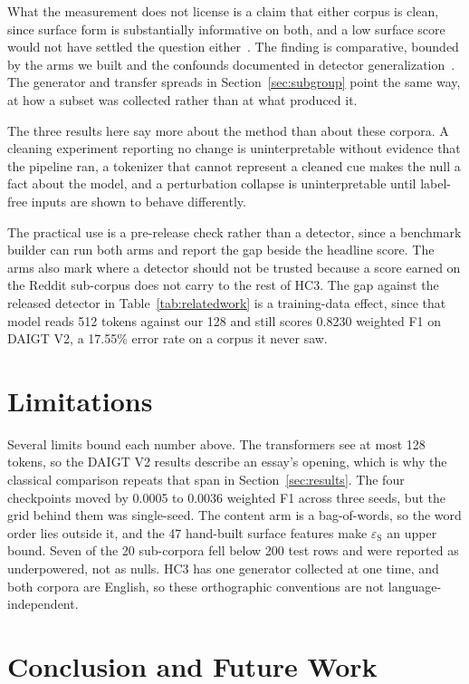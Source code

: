 \documentclass[conference,a4paper]{IEEEtran}
\newcommand{\secref}[1]{\hyperref[#1]{\ref*{#1}}}
\newcommand{\tabref}[1]{\hyperref[#1]{\ref*{#1}}}
\begin{document}
What the measurement does not license is a claim that either corpus is clean, since surface form is substantially informative on both, and a low surface score would not have settled the question either~\cite{Feng2019misleading}. The finding is comparative, bounded by the arms we built and the confounds documented in detector generalization~\cite{Borile2025generalize}. The generator and transfer spreads in Section~\secref{sec:subgroup} point the same way, at how a subset was collected rather than at what produced it.

The three results here say more about the method than about these corpora. A cleaning experiment reporting no change is uninterpretable without evidence that the pipeline ran, a tokenizer that cannot represent a cleaned cue makes the null a fact about the model, and a perturbation collapse is uninterpretable until label-free inputs are shown to behave differently.

The practical use is a pre-release check rather than a detector, since a benchmark builder can run both arms and report the gap beside the headline score. The arms also mark where a detector should not be trusted because a score earned on the Reddit sub-corpus does not carry to the rest of HC3. The gap against the released detector in Table~\tabref{tab:relatedwork} is a training-data effect, since that model reads 512 tokens against our 128 and still scores 0.8230 weighted F1 on DAIGT V2, a 17.55\% error rate on a corpus it never saw.

\section{Limitations}
\label{sec:limitations}

Several limits bound each number above. The transformers see at most 128 tokens, so the DAIGT V2 results describe an essay's opening, which is why the classical comparison repeats that span in Section~\secref{sec:results}. The four checkpoints moved by 0.0005 to 0.0036 weighted F1 across three seeds, but the grid behind them was single-seed. The content arm is a bag-of-words, so the word order lies outside it, and the 47 hand-built surface features make $\varepsilon_{\mathrm{S}}$ an upper bound. Seven of the 20 sub-corpora fell below 200 test rows and were reported as underpowered, not as nulls. HC3 has one generator collected at one time, and both corpora are English, so these orthographic conventions are not language-independent.

\section{Conclusion and Future Work}
\label{sec:conclusion}
\end{document}
